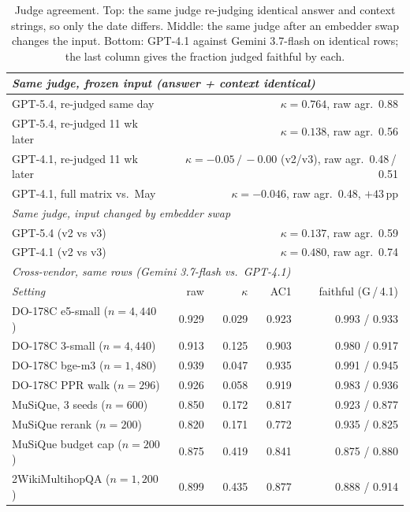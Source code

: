 \begin{table}[t]
  \centering
  \caption{Judge agreement. Top: the same judge re-judging identical answer and context strings, so only the date differs. Middle: the same judge after an embedder swap changes the input. Bottom: GPT-4.1 against Gemini 3.7-flash on identical rows; the last column gives the fraction judged faithful by each.}
  \label{tab:judges}
  \small
  \setlength{\tabcolsep}{4pt}
    \begin{tabular}{l rrrr}
    \toprule
    \multicolumn{5}{l}{\textit{Same judge, frozen input (answer + context identical)}} \\
    \midrule
    GPT-5.4, re-judged same day & \multicolumn{4}{r}{$\kappa = 0.764$, raw agr.\ 0.88} \\
    GPT-5.4, re-judged 11 wk later & \multicolumn{4}{r}{$\kappa = 0.138$, raw agr.\ 0.56} \\
    GPT-4.1, re-judged 11 wk later & \multicolumn{4}{r}{$\kappa = -0.05\,/\,-0.00$ (v2/v3), raw agr.\ 0.48\,/\,0.51} \\
    GPT-4.1, full matrix vs.\ May & \multicolumn{4}{r}{$\kappa = -0.046$, raw agr.\ 0.48, $+43$\,pp} \\
    \midrule
    \multicolumn{5}{l}{\textit{Same judge, input changed by embedder swap}} \\
    \midrule
    GPT-5.4 (v2 vs v3) & \multicolumn{4}{r}{$\kappa = 0.137$, raw agr.\ 0.59} \\
    GPT-4.1 (v2 vs v3) & \multicolumn{4}{r}{$\kappa = 0.480$, raw agr.\ 0.74} \\
    \midrule
    \multicolumn{5}{l}{\textit{Cross-vendor, same rows (Gemini 3.7-flash vs.\ GPT-4.1)}} \\
    \midrule
    \textit{Setting} & raw & $\kappa$ & AC1 & faithful (G\,/\,4.1) \\
    \midrule
    DO-178C e5-small ($n{=}4{,}440$) & 0.929 & 0.029 & 0.923 & 0.993 / 0.933 \\
    DO-178C 3-small ($n{=}4{,}440$)  & 0.913 & 0.125 & 0.903 & 0.980 / 0.917 \\
    DO-178C bge-m3 ($n{=}1{,}480$)   & 0.939 & 0.047 & 0.935 & 0.991 / 0.945 \\
    DO-178C PPR walk ($n{=}296$)     & 0.926 & 0.058 & 0.919 & 0.983 / 0.936 \\
    MuSiQue, 3 seeds ($n{=}600$)     & 0.850 & 0.172 & 0.817 & 0.923 / 0.877 \\
    MuSiQue rerank ($n{=}200$)       & 0.820 & 0.171 & 0.772 & 0.935 / 0.825 \\
    MuSiQue budget cap ($n{=}200$)   & 0.875 & 0.419 & 0.841 & 0.875 / 0.880 \\
    2WikiMultihopQA ($n{=}1{,}200$)  & 0.899 & 0.435 & 0.877 & 0.888 / 0.914 \\
    \bottomrule
  \end{tabular}
\end{table}
